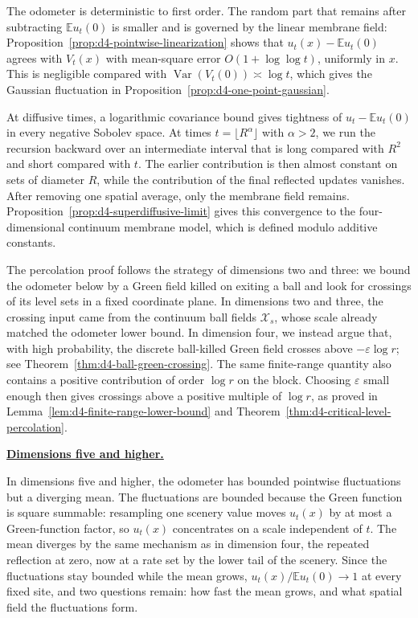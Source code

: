 \documentclass[11pt]{amsart}
\theoremstyle{plain}
\theoremstyle{definition}
\newcommand{\E}{\mathbb{E}}
\DeclareMathOperator{\Var}{Var}
\begin{document}
The odometer is deterministic to first order. The random part that
remains after subtracting $\E u_t(0)$ is smaller and is governed by the linear membrane field: Proposition~\ref{prop:d4-pointwise-linearization} shows that $u_t(x)-\E u_t(0)$ agrees with $V_t(x)$ with mean-square error $O(1+\log\log t)$, uniformly in $x$. This is negligible compared
with $\Var(V_t(0))\asymp\log t$, which gives the Gaussian fluctuation in Proposition~\ref{prop:d4-one-point-gaussian}.

At diffusive times, a logarithmic covariance bound gives tightness of
$u_t-\E u_t(0)$ in every negative Sobolev space. At times
$t=\lfloor R^\alpha\rfloor$ with $\alpha>2$, we run the recursion backward over an intermediate interval that is long compared with $R^2$ and short compared with $t$. The earlier contribution is then almost constant on sets of diameter $R$, while the contribution of the final reflected updates vanishes. After removing one spatial average, only the membrane field remains. Proposition~\ref{prop:d4-superdiffusive-limit} gives this convergence to the four-dimensional continuum membrane model, which is defined modulo additive constants.

The percolation proof follows the strategy of dimensions two and three: we bound the odometer below by a Green field killed on exiting a ball and
look for crossings of its level sets in a fixed coordinate plane. In dimensions two and three, the crossing input came from the continuum ball fields $\mathcal X_s$, whose scale already matched the odometer lower bound. In dimension four, we instead argue that, with high probability, the discrete ball-killed Green field crosses above
$-\varepsilon\log r$; see Theorem~\ref{thm:d4-ball-green-crossing}. The same finite-range quantity also contains a positive contribution of order
$\log r$ on the block. Choosing $\varepsilon$ small enough then gives crossings above a positive multiple of $\log r$, as proved in Lemma~\ref{lem:d4-finite-range-lower-bound} and
Theorem~\ref{thm:d4-critical-level-percolation}.

\smallskip
\noindent\underline{\textbf{\textup{Dimensions five and higher.}}}

In dimensions five and higher, the odometer has bounded pointwise fluctuations but a diverging mean. The fluctuations are bounded because the Green function is square summable: resampling one scenery value moves
$u_t(x)$ by at most a Green-function factor, so $u_t(x)$ concentrates on a
scale independent of $t$. The mean diverges by the same mechanism as in dimension four, the repeated reflection at zero, now at a rate set by the lower tail of the scenery.
Since the fluctuations stay bounded while the mean grows, $u_t(x)/\E u_t(0)\to1$ at every fixed site, and two questions remain: how fast
the mean grows, and what spatial field the fluctuations form.
\end{document}
